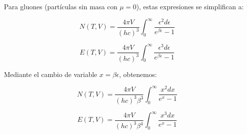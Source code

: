 
Para gluones (partículas sin masa con $\mu=0$), estas expresiones se simplifican a:

\begin{equation}\label{eq-BE-Ntotalintnofug}
N(T,V) = \frac{4\pi V}{(hc)^3} \int_0^\infty \frac{\epsilon^2 d\epsilon}{e^{\beta\epsilon}-1}
\end{equation}

\begin{equation}\label{eq-BE-Etotalintnofug}
E(T,V) = \frac{4\pi V}{(hc)^3} \int_0^\infty \frac{\epsilon^3 d\epsilon}{e^{\beta\epsilon}-1}
\end{equation}




Mediante el cambio de variable $x=\beta\epsilon$, obtenemos:

\begin{equation}\label{eq-BE-Ntotalintnofug-x}
N(T,V) = \frac{4\pi V}{(hc)^3 \beta^3} \int_0^\infty \frac{x^2 dx}{e^x-1}
\end{equation}

\begin{equation}\label{eq-BE-Etotalintnofug-x}
E(T,V) = \frac{4\pi V}{(hc)^3 \beta^4} \int_0^\infty \frac{x^3 dx}{e^x-1}
\end{equation}

